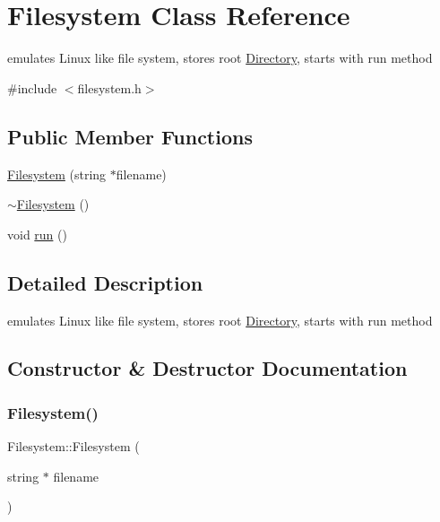\hypertarget{class_filesystem}{}\section{Filesystem Class Reference}
\label{class_filesystem}


emulates Linux like file system, stores root \hyperlink{class_directory}{Directory}, starts with run method  




{\ttfamily \#include $<$filesystem.\+h$>$}

\subsection*{Public Member Functions}
\begin{DoxyCompactItemize}
\item 
\hyperlink{class_filesystem_aac89cbe467cc517e80049e0277812040}{Filesystem} (string $\ast$filename)
\item 
\hyperlink{class_filesystem_a8d4d73d3d4e56fd6792bdb83f6c5dfd8}{$\sim$\+Filesystem} ()
\item 
void \hyperlink{class_filesystem_a373c34da491ec8d269cbc18d52a1ad79}{run} ()
\end{DoxyCompactItemize}


\subsection{Detailed Description}
emulates Linux like file system, stores root \hyperlink{class_directory}{Directory}, starts with run method 

\subsection{Constructor \& Destructor Documentation}
\mbox{\label{class_filesystem_aac89cbe467cc517e80049e0277812040}} 
\subsubsection{\texorpdfstring{Filesystem()}{Filesystem()}}
{\footnotesize\ttfamily Filesystem\+::\+Filesystem (\begin{DoxyParamCaption}\item[{string $\ast$}]{filename }\end{DoxyParamCaption})\hspace{0.3cm}{\ttfamily [inline]}}

